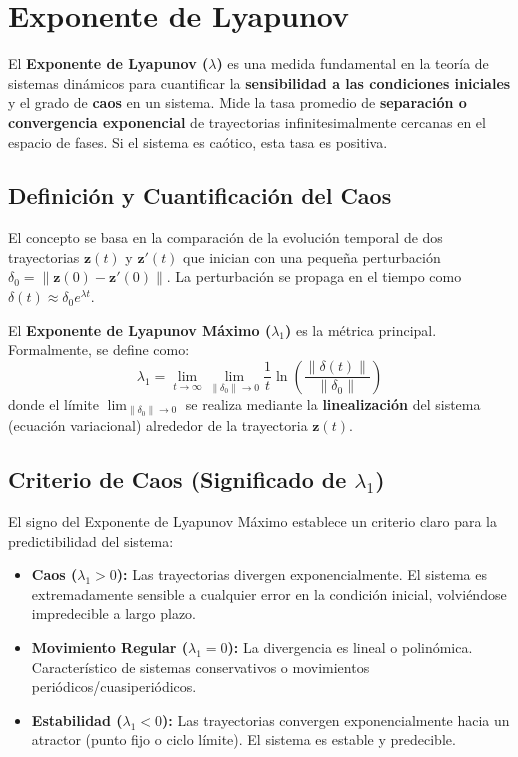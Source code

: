 \section{Exponente de Lyapunov}
\label{sec:lyapunnov_exponent}

El \textbf{Exponente de Lyapunov ($\lambda$)} es una medida fundamental en la teoría de sistemas dinámicos para cuantificar la \textbf{sensibilidad a las condiciones iniciales} y el grado de \textbf{caos} en un sistema. Mide la tasa promedio de \textbf{separación o convergencia exponencial} de trayectorias infinitesimalmente cercanas en el espacio de fases. Si el sistema es caótico, esta tasa es positiva.

\subsection{Definición y Cuantificación del Caos}

El concepto se basa en la comparación de la evolución temporal de dos trayectorias $\mathbf{z}(t)$ y $\mathbf{z}'(t)$ que inician con una pequeña perturbación $\delta_0 = \|\mathbf{z}(0) - \mathbf{z}'(0)\|$. La perturbación se propaga en el tiempo como $\delta(t) \approx \delta_0 e^{\lambda t}$.

El \textbf{Exponente de Lyapunov Máximo ($\lambda_1$)} es la métrica principal. Formalmente, se define como:
\begin{equation}
    \lambda_1 = \lim_{t \to \infty} \lim_{\|\delta_0\| \to 0} \frac{1}{t} \ln \left( \frac{\|\delta(t)\|}{\|\delta_0\|} \right)
\end{equation}
donde el límite $\lim_{\|\delta_0\| \to 0}$ se realiza mediante la \textbf{linealización} del sistema (ecuación variacional) alrededor de la trayectoria $\mathbf{z}(t)$.

\subsection{Criterio de Caos (Significado de $\lambda_1$)}

El signo del Exponente de Lyapunov Máximo establece un criterio claro para la predictibilidad del sistema:

\begin{itemize}
    \item \textbf{Caos ($\lambda_1 > 0$):} Las trayectorias divergen exponencialmente. El sistema es extremadamente sensible a cualquier error en la condición inicial, volviéndose impredecible a largo plazo.
    \item \textbf{Movimiento Regular ($\lambda_1 = 0$):} La divergencia es lineal o polinómica. Característico de sistemas conservativos o movimientos periódicos/cuasiperiódicos.
    \item \textbf{Estabilidad ($\lambda_1 < 0$):} Las trayectorias convergen exponencialmente hacia un atractor (punto fijo o ciclo límite). El sistema es estable y predecible.
\end{itemize}

